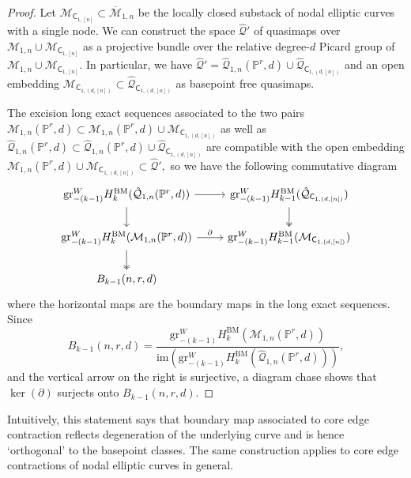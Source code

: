 \documentclass[12pt,reqno]{amsart}
\theoremstyle{definition}
\theoremstyle{definition}
\theoremstyle{definition}
\theoremstyle{definition}
\newcommand{\ol}[1]{\overline{#1}}
\newcommand{\PP}{\mathbb{P}}
\newcommand{\Mcal}{\mathcal{M}}
\newcommand{\Mbar}{\ol{\Mcal}}
\newcommand{\gr}{\mathrm{gr}}
\begin{document}
\begin{proof}
  Let $\mathcal{M}_{\mathsf{C}_{1,[n]}}\subset \Mbar_{1,n}$ be the locally closed substack of nodal elliptic curves with a single node. We can construct the space $\hat{\mathcal{Q}}'$ of quasimaps over $\mathcal{M}_{1,n}\cup \mathcal{M}_{\mathsf{C}_{1,[n]}}$ as a projective bundle over the relative degree-$d$ Picard group of $\mathcal{M}_{1,n}\cup \mathcal{M}_{\mathsf{C}_{1,[n]}}.$ In particular, we have $\hat{\mathcal{Q}}' = \hat{\mathcal{Q}}_{1,n}(\PP^r,d)\cup  \hat{\mathcal{Q}}_{\mathsf{C}_{1,(d, [n])}}$ and an open embedding $\mathcal{M}_{\mathsf{C}_{1,(d, [n])}}\subset \hat{\mathcal{Q}}_{\mathsf{C}_{1,(d, [n])}}$ as basepoint free quasimaps.

  The excision long exact sequences associated to the two pairs $\mathcal{M}_{1,n}(\PP^r,d)\subset \mathcal{M}_{1,n}(\PP^r,d)\cup \mathcal{M}_{\mathsf{C}_{1,(d, [n])}}$ as well as $\hat{\mathcal{Q}}_{1,n}(\PP^r,d)\subset \hat{\mathcal{Q}}_{1,n}(\PP^r,d)\cup \hat{\mathcal{Q}}_{\mathsf{C}_{1,(d, [n])}}$ are compatible with the open embedding $\mathcal{M}_{1,n}(\PP^r,d)\cup \mathcal{M}_{\mathsf{C}_{1,(d, [n])}}\subset \hat{\mathcal{Q}}',$ so we have the following commutative diagram \[\begin{tikzcd}
	{\gr^W_{-(k-1)}H_k^{\mathrm{BM}}(\hat{\mathcal{Q}}_{1,n}(\PP^r,d))} & { \gr^W_{-(k-1)}H_{k-1}^{\mathrm{BM}}(\hat{\mathcal{Q}}_{\mathsf{C}_{1,(d, [n])}})} \\
	{\gr^W_{-(k-1)}H_k^{\mathrm{BM}}({\mathcal{M}}_{1,n}(\PP^r,d))} & { \gr^W_{-(k-1)}H_{k-1}^{\mathrm{BM}}({\mathcal{M}}_{\mathsf{C}_{1,(d, [n])}})} \\
	{B_{k-1}(n,r,d)}
	\arrow[from=1-1, to=1-2]
	\arrow[from=1-1, to=2-1]
	\arrow[two heads, from=1-2, to=2-2]
	\arrow["\partial", from=2-1, to=2-2]
	\arrow[two heads, from=2-1, to=3-1]
\end{tikzcd}\] where the horizontal maps are the boundary maps in the long exact sequences. Since $$B_{k-1}(n,r,d)=\frac{\gr^W_{-(k-1)}H_k^{\mathrm{BM}}({\mathcal{M}}_{1,n}(\PP^r,d))}{\mathrm{im}(\gr^W_{-(k-1)}H_k^{\mathrm{BM}}(\hat{\mathcal{Q}}_{1,n}(\PP^r,d)))},$$ and the vertical arrow on the right is surjective, a diagram chase shows that $\ker(\partial)$ surjects onto $B_{k-1}(n,r,d).$
\end{proof}

Intuitively, this statement says that boundary map associated to core edge contraction reflects degeneration of the underlying curve and is hence `orthogonal' to the basepoint classes. The same construction applies to core edge contractions of nodal elliptic curves in general.
\end{document}
